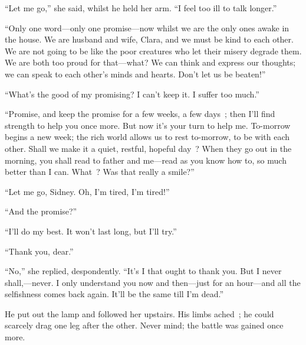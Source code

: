 ``Let me go,'' she said, whilst he held her arm. ``I feel too ill to
talk longer.''

``Only one word---only one promise---now whilst we are the only ones
awake in the house. We are husband and wife, Clara, and we must be kind
to each other. We are not going to be like the poor creatures who let
their misery degrade them. We are both too proud for that---what? We can
think and express our thoughts; we can speak to each other's minds and
hearts. Don't let us be beaten!''

``What's the good of my promising? I can't keep it. I suffer too much.''

{\protect\hypertarget{284}{}{}} ``Promise, and keep the promise for a
few weeks, a few days~; then I'll find strength to help you once more.
But now it's your turn to help me. To-morrow begins a new week; the rich
world allows us to rest to-morrow, to be with each other. Shall we make
it a quiet, restful, hopeful day~? When they go out in the morning, you
shall read to father and me---read as you know how to, so much better
than I can. What~? Was that really a smile?''

``Let me go, Sidney. Oh, I'm tired, I'm tired!''

``And the promise?''

``I'll do my best. It won't last long, but I'll try.''

``Thank you, dear.''

``No,'' she replied, despondently. ``It's I that ought to thank you. But
I never shall,---never. I only understand you now and then---just for an
hour---and all the selfishness comes back again. It'll be the same till
I'm dead.''

He put out the lamp and followed her upstairs. His limbs ached~; he
could scarcely drag one leg after the other. Never mind; the battle was
gained once more.
